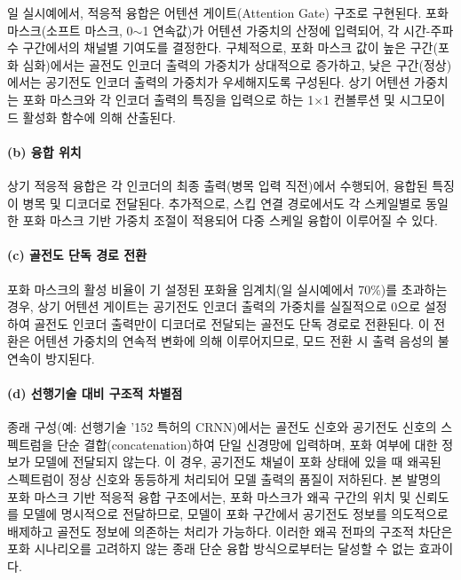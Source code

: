 \documentclass{article}
\begin{document}
일 실시예에서, 적응적 융합은 어텐션 게이트(Attention Gate) 구조로 구현된다. 포화 마스크(소프트 마스크, 0$\sim$1 연속값)가 어텐션 가중치의 산정에 입력되어, 각 시간-주파수 구간에서의 채널별 기여도를 결정한다. 구체적으로, 포화 마스크 값이 높은 구간(포화 심화)에서는 골전도 인코더 출력의 가중치가 상대적으로 증가하고, 낮은 구간(정상)에서는 공기전도 인코더 출력의 가중치가 우세해지도록 구성된다. 상기 어텐션 가중치는 포화 마스크와 각 인코더 출력의 특징을 입력으로 하는 1$\times$1 컨볼루션 및 시그모이드 활성화 함수에 의해 산출된다.

\paragraph{(b) 융합 위치}

상기 적응적 융합은 각 인코더의 최종 출력(병목 입력 직전)에서 수행되어, 융합된 특징이 병목 및 디코더로 전달된다. 추가적으로, 스킵 연결 경로에서도 각 스케일별로 동일한 포화 마스크 기반 가중치 조절이 적용되어 다중 스케일 융합이 이루어질 수 있다.

\paragraph{(c) 골전도 단독 경로 전환}

포화 마스크의 활성 비율이 기 설정된 포화율 임계치(일 실시예에서 70\%)를 초과하는 경우, 상기 어텐션 게이트는 공기전도 인코더 출력의 가중치를 실질적으로 0으로 설정하여 골전도 인코더 출력만이 디코더로 전달되는 골전도 단독 경로로 전환된다. 이 전환은 어텐션 가중치의 연속적 변화에 의해 이루어지므로, 모드 전환 시 출력 음성의 불연속이 방지된다.

\paragraph{(d) 선행기술 대비 구조적 차별점}

종래 구성(예: 선행기술 '152 특허의 CRNN)에서는 골전도 신호와 공기전도 신호의 스펙트럼을 단순 결합(concatenation)하여 단일 신경망에 입력하며, 포화 여부에 대한 정보가 모델에 전달되지 않는다. 이 경우, 공기전도 채널이 포화 상태에 있을 때 왜곡된 스펙트럼이 정상 신호와 동등하게 처리되어 모델 출력의 품질이 저하된다. 본 발명의 포화 마스크 기반 적응적 융합 구조에서는, 포화 마스크가 왜곡 구간의 위치 및 신뢰도를 모델에 명시적으로 전달하므로, 모델이 포화 구간에서 공기전도 정보를 의도적으로 배제하고 골전도 정보에 의존하는 처리가 가능하다. 이러한 왜곡 전파의 구조적 차단은 포화 시나리오를 고려하지 않는 종래 단순 융합 방식으로부터는 달성할 수 없는 효과이다.
\end{document}
